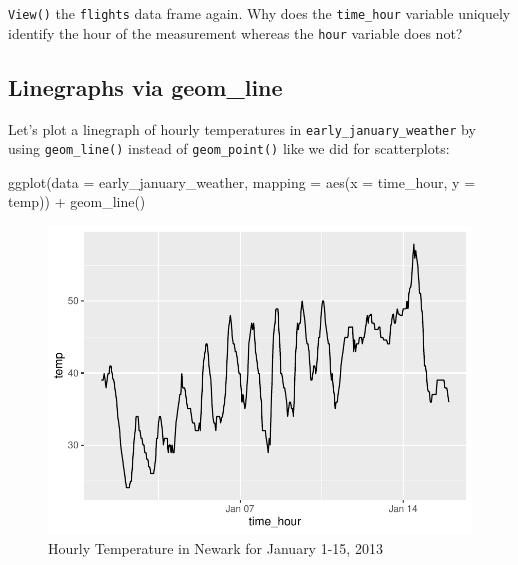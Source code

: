 \documentclass[
  letterpaper,
  DIV=11,
  numbers=noendperiod]{scrreprt}
\newenvironment{Shaded}{\begin{snugshade}}{\end{snugshade}}
\newcommand{\AttributeTok}[1]{\textcolor[rgb]{0.40,0.45,0.13}{#1}}
\newcommand{\FunctionTok}[1]{\textcolor[rgb]{0.28,0.35,0.67}{#1}}
\newcommand{\NormalTok}[1]{\textcolor[rgb]{0.00,0.23,0.31}{#1}}
\newcommand{\SpecialCharTok}[1]{\textcolor[rgb]{0.37,0.37,0.37}{#1}}
\theoremstyle{definition}
\theoremstyle{remark}
\begin{document}
\begin{tcolorbox}[enhanced jigsaw, colback=white, toprule=.15mm, bottomrule=.15mm, titlerule=0mm, title={{🎯} Learning Check 2.10}, leftrule=.75mm, arc=.35mm, left=2mm, colframe=quarto-callout-tip-color-frame, coltitle=black, opacitybacktitle=0.6, bottomtitle=1mm, colbacktitle=quarto-callout-tip-color!10!white, opacityback=0, toptitle=1mm, rightrule=.15mm, breakable]

\texttt{View()} the \texttt{flights} data frame again. Why does the
\texttt{time\_hour} variable uniquely identify the hour of the
measurement whereas the \texttt{hour} variable does not?

\end{tcolorbox}

\hypertarget{sec-geomline}{%
\subsection{Linegraphs via geom\_line}\label{sec-geomline}}

Let's plot a linegraph of hourly temperatures in
\texttt{early\_january\_weather} by using \texttt{geom\_line()} instead
of \texttt{geom\_point()} like we did for scatterplots:

\begin{Shaded}
\begin{Highlighting}[]
\FunctionTok{ggplot}\NormalTok{(}\AttributeTok{data =}\NormalTok{ early\_january\_weather, }\AttributeTok{mapping =} \FunctionTok{aes}\NormalTok{(}\AttributeTok{x =}\NormalTok{ time\_hour, }\AttributeTok{y =}\NormalTok{ temp)) }\SpecialCharTok{+}
  \FunctionTok{geom\_line}\NormalTok{()}
\end{Highlighting}
\end{Shaded}

\begin{figure}[H]

{\centering \includegraphics{02-visualization_files/figure-pdf/fig-hourlytemp-1.pdf}

}

\caption{\label{fig-hourlytemp}Hourly Temperature in Newark for January
1-15, 2013}

\end{figure}
\end{document}
